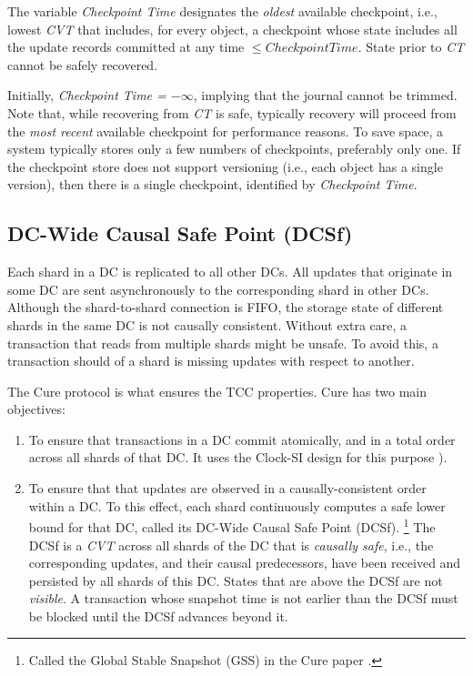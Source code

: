 \documentclass[twoside]{article}
\begin{document}
The variable \emph{Checkpoint Time} designates the \emph{oldest} available
checkpoint, i.e., lowest \emph{CVT} that includes, for every object, a
checkpoint whose state includes all the update records committed at any time
$\le \mathit{Checkpoint Time}$.
State prior to \emph{CT} cannot be safely recovered.


Initially, \emph{Checkpoint Time = $-\infty$}, implying that the journal
cannot be trimmed.
Note that, while recovering from \emph{CT} is safe, typically recovery will
proceed from the \emph{most recent} available checkpoint for performance
reasons.
To save space, a system typically stores only a few numbers of checkpoints,
preferably only one. 
If the checkpoint store does not support versioning (i.e., each object
has a single version), then there is a single checkpoint, identified by
\emph{Checkpoint Time}.


\subsection{DC-Wide Causal Safe Point (DCSf)}
\label{sec:dcsf}
Each shard in a DC is replicated to all other DCs.
All updates that originate in some DC are sent asynchronously to the
corresponding shard in other DCs.
Although the shard-to-shard connection is FIFO, the storage state of
different shards in the same DC is not causally consistent.
Without extra care, a transaction that reads from multiple shards might
be unsafe.
To avoid this, a transaction should of a shard is missing updates with
respect to another.

The Cure protocol \cite{rep:pro:sh182} is what ensures the TCC properties.
Cure has two main objectives:
\begin{enumerate}%
\item To ensure that transactions in a DC commit atomically, and in a
  total order across all shards of that DC\@.
  It uses the Clock-SI design for this purpose
  \cite{rep:pan:1723}).
\item To ensure that that updates are observed in a causally-consistent
  order within a DC\@.
  To this effect, each shard continuously computes a safe lower bound
  for that DC, called its DC-Wide Causal Safe Point (DCSf).%
\footnote{
  Called the Global Stable Snapshot (GSS) in the Cure paper
  \cite{rep:pro:sh182}.
}
  The DCSf is a \emph{CVT} across all shards of the DC that is
  \emph{causally safe}, i.e., the corresponding updates, and their causal
  predecessors, have been received and persisted by all shards of this DC.
  States that are above the DCSf are not \emph{visible}.
  A transaction whose snapshot time is not earlier than the DCSf must
  be blocked until the DCSf advances beyond it.
\end{enumerate}
\end{document}
